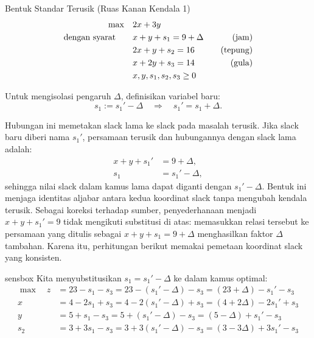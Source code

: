 \begin{sensdisplay}{Bentuk Standar Terusik (Ruas Kanan Kendala 1)}
\[
\begin{aligned}
\max \quad & 2x + 3y \\
\mbox{dengan syarat}\quad \quad
& x + y + s_1 = 9 + \Delta \quad & \mbox{(jam)} \\
& 2x + y + s_2 = 16 \quad & \mbox{(tepung)} \\
& x + 2y + s_3 = 14 \quad & \mbox{(gula)} \\
& x, y, s_1, s_2, s_3 \geq 0
\end{aligned}
\]

Untuk mengisolasi pengaruh \( \Delta \), definisikan variabel baru:
\[
s_1 := s_1' - \Delta \quad \Rightarrow \quad s_1' = s_1 + \Delta.
\]

Hubungan ini memetakan slack lama ke slack pada masalah terusik. Jika slack baru diberi nama \(s_1'\), persamaan terusik dan hubungannya dengan slack lama adalah:
\[
\begin{aligned}
 x + y + s_1' &= 9 + \Delta, \\
 s_1 &= s_1' - \Delta,
\end{aligned}
\]
sehingga nilai slack dalam kamus lama dapat diganti dengan \(s_1' - \Delta\). Bentuk ini menjaga identitas aljabar antara kedua koordinat slack tanpa mengubah kendala terusik.
Sebagai koreksi terhadap sumber, penyederhanaan menjadi \(x+y+s_1'=9\) tidak mengikuti substitusi di atas: memasukkan relasi tersebut ke persamaan yang ditulis sebagai \(x+y+s_1=9+\Delta\) menghasilkan faktor \(\Delta\) tambahan. Karena itu, perhitungan berikut memakai pemetaan koordinat slack yang konsisten.
\end{sensdisplay}

\begin{steppanel}{sensbox}
Kita menyubstitusikan \( s_1 = s_1' - \Delta \) ke dalam kamus optimal:
\[
\begin{aligned}
\max \quad
z &= 23 - s_1 - s_3 = 23 - (s_1' - \Delta) - s_3 = (23 + \Delta) - s_1' - s_3 \\
x &= 4 - 2s_1 + s_3 = 4 - 2(s_1' - \Delta) + s_3 = (4 + 2\Delta) - 2s_1' + s_3 \\
y &= 5 + s_1 - s_3 = 5 + (s_1' - \Delta) - s_3 = (5 - \Delta) + s_1' - s_3 \\
s_2 &= 3 + 3s_1 - s_3 = 3 + 3(s_1' - \Delta) - s_3 = (3 - 3\Delta) + 3s_1' - s_3
\end{aligned}
\]
\end{steppanel}

